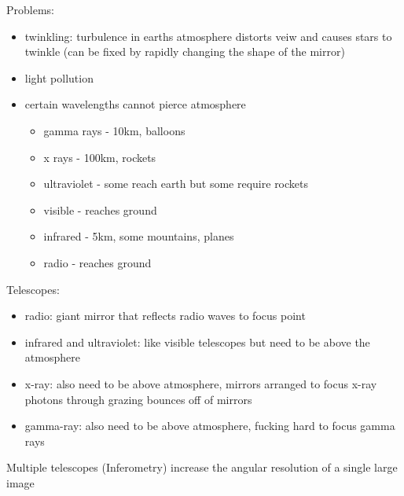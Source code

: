 \documentclass[12pt]{article}
\begin{document}
Problems:
\begin{itemize}
\item twinkling: turbulence in earths atmosphere distorts veiw and causes stars to twinkle (can be fixed by rapidly changing the shape of the mirror)
\item light pollution
\item certain wavelengths cannot pierce atmosphere
\begin{itemize}
\item gamma rays - 10km, balloons
\item x rays - 100km, rockets
\item ultraviolet - some reach earth but some require rockets
\item visible - reaches ground
\item infrared - 5km, some mountains, planes
\item radio - reaches ground
\end{itemize}
\end{itemize}

Telescopes:
\begin{itemize}
\item radio: giant mirror that reflects radio waves to focus point
\item infrared and ultraviolet: like visible telescopes but need to be above the atmosphere
\item x-ray: also need to be above atmosphere, mirrors arranged to focus x-ray photons through grazing bounces off of mirrors
\item gamma-ray: also need to be above atmosphere, fucking hard to focus gamma rays
\end{itemize}

Multiple telescopes (Inferometry) increase the angular resolution of a single large image
\end{document}
